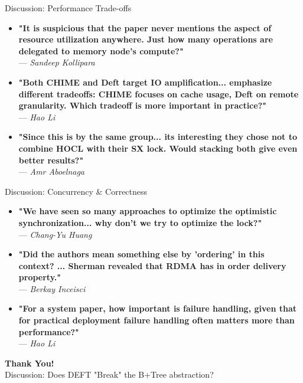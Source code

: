 \documentclass[aspectratio=169,10pt]{beamer}
\begin{document}
\begin{frame}[t]{Discussion: Performance Trade-offs}
\begin{itemize}
    \item \textbf{"It is suspicious that the paper never mentions the aspect of resource utilization anywhere. Just how many operations are delegated to memory node’s compute?"} \\ --- \textit{Sandeep Kollipara}
    \item \textbf{"Both CHIME and Deft target IO amplification... emphasize different tradeoffs: CHIME focuses on cache usage, Deft on remote granularity. Which tradeoff is more important in practice?"} \\ --- \textit{Hao Li}
    \item \textbf{"Since this is by the same group... its interesting they chose not to combine HOCL with their SX lock. Would stacking both give even better results?"} \\ --- \textit{Amr Aboelnaga}
\end{itemize}
\end{frame}

\begin{frame}[t]{Discussion: Concurrency \& Correctness}
\begin{itemize}
    \item \textbf{"We have seen so many approaches to optimize the optimistic synchronization... why don't we try to optimize the lock?"} \\ --- \textit{Chang-Yu Huang}
    \item \textbf{"Did the authors mean something else by 'ordering' in this context? ... Sherman revealed that RDMA has in order delivery property."} \\ --- \textit{Berkay Inceisci}
    \item \textbf{"For a system paper, how important is failure handling, given that for practical deployment failure handling often matters more than performance?"} \\ --- \textit{Hao Li}
\end{itemize}
\end{frame}

\begin{frame}[plain]
    \begin{center}
        {\LARGE\textbf{Thank You!}}\\[15pt]
        {\large Discussion: Does DEFT "Break" the B+Tree abstraction?}
    \end{center}
\end{frame}
\end{document}
